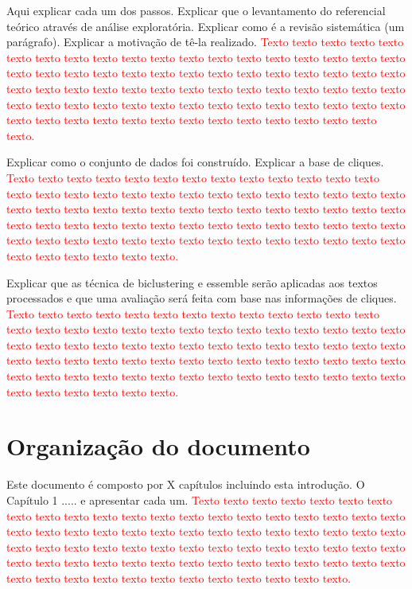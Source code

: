 \documentclass[normaltoc, espacoumemeio, pnumromarab,ruledheader]{abnt}
\begin{document}
Aqui explicar cada um dos passos. Explicar que o levantamento do referencial teórico através de análise exploratória. Explicar como é a revisão sistemática (um parágrafo). Explicar a motivação de tê-la realizado. \textcolor{red}{Texto texto texto texto texto texto texto texto texto texto texto texto texto texto texto texto texto texto texto texto texto texto texto texto texto texto texto texto texto texto texto texto texto texto texto texto texto texto texto texto texto texto texto texto texto texto texto texto texto texto texto texto texto texto texto texto texto texto texto texto texto texto texto texto texto texto texto texto texto texto texto texto texto texto texto.}

Explicar como o conjunto de dados foi construído. Explicar a base de cliques. \textcolor{red}{Texto texto texto texto texto texto texto texto texto texto texto texto texto texto texto texto texto texto texto texto texto texto texto texto texto texto texto texto texto texto texto texto texto texto texto texto texto texto texto texto texto texto texto texto texto texto texto texto texto texto texto texto texto texto texto texto texto texto texto texto texto texto texto texto texto texto texto texto texto texto texto texto texto texto texto.}

Explicar que as técnica de biclustering e essemble serão aplicadas aos textos processados e que uma avaliação será feita com base nas informações de cliques. \textcolor{red}{Texto texto texto texto texto texto texto texto texto texto texto texto texto texto texto texto texto texto texto texto texto texto texto texto texto texto texto texto texto texto texto texto texto texto texto texto texto texto texto texto texto texto texto texto texto texto texto texto texto texto texto texto texto texto texto texto texto texto texto texto texto texto texto texto texto texto texto texto texto texto texto texto texto texto texto.}

\section{Organização do documento}

Este documento é composto por X capítulos incluindo esta introdução. O Capítulo 1 ..... e apresentar cada um. \textcolor{red}{Texto texto texto texto texto texto texto texto texto texto texto texto texto texto texto texto texto texto texto texto texto texto texto texto texto texto texto texto texto texto texto texto texto texto texto texto texto texto texto texto texto texto texto texto texto texto texto texto texto texto texto texto texto texto texto texto texto texto texto texto texto texto texto texto texto texto texto texto texto texto texto texto texto texto texto.}
\end{document}
